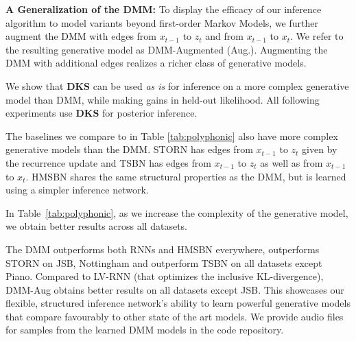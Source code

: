 \documentclass[letterpaper]{article}
\theoremstyle{plain}
\newcommand{\DKF}{DMM\xspace}
\newcommand{\DMM}{DMM\xspace}
\newcommand{\DKS}{\textbf{DKS}\xspace}
\begin{document}
{\textbf{A Generalization of the \DMM: }
To display the efficacy of our inference algorithm to model variants beyond
first-order Markov Models, we further augment the \DKF with edges from $x_{t-1}$ to $z_t$
and from $x_{t-1}$ to $x_t$.  
We refer to the resulting generative model as \DKF-Augmented (Aug.).
Augmenting the \DKF
with additional edges 
realizes a richer
class of generative models.

We show that \textbf{\DKS} can be used \emph{as is} for inference on 
a more complex generative model than \DMM, while making gains in held-out likelihood. All following experiments use {\bf \DKS} for posterior inference.

The baselines we compare to in Table \ref{tab:polyphonic} also have more complex generative models than the \DKF. 
STORN has edges from $x_{t-1}$ to $z_{t}$ given by the recurrence update
and TSBN has edges from $x_{t-1}$ to $z_{t}$ as well as from $x_{t-1}$ to $x_t$.  
HMSBN shares
the same structural properties as the \DKF, but
is learned using a simpler inference network. 

In Table~\ref{tab:polyphonic}, 
as we increase the complexity of the generative model, we obtain better results across all datasets. 

The \DKF outperforms both RNNs and HMSBN everywhere, outperforms STORN on JSB, Nottingham 
and outperform TSBN on all datasets except Piano. 
Compared to LV-RNN (that optimizes the inclusive KL-divergence), 
\DKF-Aug obtains better results on all datasets except JSB. This showcases our flexible, structured inference network's ability to learn 
powerful generative models that compare favourably to other 
state of the art models. We provide audio
files for samples from the learned \DMM models in the code repository. 

}
\end{document}

